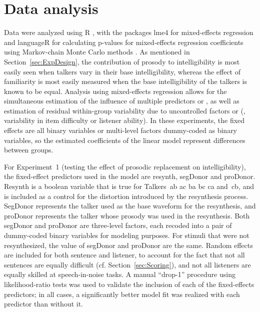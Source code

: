 \section{Data analysis\label{sec:DataAnal}}
Data were analyzed using R \citep{R}, with the packages {\inlinecode lme4} for mixed-effects regression \citep{lmer} and {\inlinecode languageR} for calculating p-values for mixed-effects regression coefficients using Markov-chain Monte Carlo methods \citep{languageR}.  As mentioned in Section~\ref{sec:ExpDesign}, the contribution of prosody to intelligibility is most easily seen when talkers vary in their base intelligibility, whereas the effect of familiarity is most easily measured when the base intelligibility of the talkers is known to be equal.  Analysis using mixed-effects regression allows for the simultaneous estimation of the influence of multiple predictors or , as well as estimation of residual within-group variability due to uncontrolled factors or  (\eg, variability in item difficulty or listener ability).  In these experiments, the fixed effects are all binary variables or multi-level factors dummy-coded as binary variables, so the estimated coefficients of the linear model represent differences between groups.

For Experiment~1 (testing the effect of prosodic replacement on intelligibility), the fixed-effect predictors used in the model are {\inlinecode resynth}, {\inlinecode segDonor} and {\inlinecode proDonor}.  {\inlinecode Resynth} is a boolean variable that is true for Talkers~\ac{ab ac ba bc ca} and~\ac{cb}, and is included as a control for the distortion introduced by the resynthesis process.  {\inlinecode SegDonor} represents the talker used as the base waveform for the resynthesis, and {\inlinecode proDonor} represents the talker whose prosody was used in the resynthesis.  Both {\inlinecode segDonor} and {\inlinecode proDonor} are three-level factors, each recoded into a pair of dummy-coded binary variables for modeling purposes.  For stimuli that were not resynthesized, the value of {\inlinecode segDonor} and {\inlinecode proDonor} are the same.  Random effects are included for both sentence and listener, to account for the fact that not all sentences are equally difficult (cf. Section~\ref{sec:Scoring}), and not all listeners are equally skilled at speech-in-noise tasks.  A manual “drop-1” procedure using likelihood-ratio tests was used to validate the inclusion of each of the fixed-effects predictors; in all cases, a significantly better model fit was realized with each predictor than without it.

